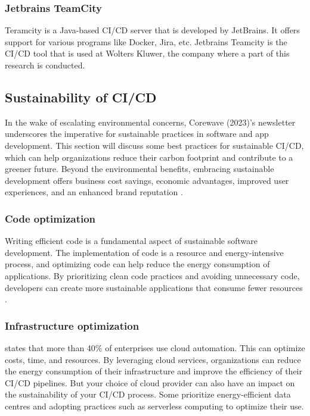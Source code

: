 \subsubsection{Jetbrains TeamCity}
Teramcity is a Java-based CI/CD server that is developed by JetBrains. It offers support for various programs like Docker, Jira, etc.
Jetbrains Teamcity is the CI/CD tool that is used at Wolters Kluwer, the company where a part of this research is conducted.

\subsection{Sustainability of CI/CD}
In the wake of escalating environmental concerns, Corewave (2023)’s newsletter underscores the imperative for sustainable practices in software and app development.
This section will discuss some best practices for sustainable CI/CD, which can help organizations reduce their carbon footprint and contribute to a greener future.
Beyond the environmental benefits, embracing sustainable development offers business cost savings, economic advantages, improved user experiences, and an enhanced brand reputation \autocite{linkedin}.

\subsubsection{Code optimization}
Writing efficient code is a fundamental aspect of sustainable software development. 
The implementation of code is a resource and energy-intensive process, and optimizing code can help reduce the energy consumption of applications.
By prioritizing clean code practices and avoiding unnecessary code, developers can create more sustainable applications that consume fewer resources \autocite{linkedin}.

\subsubsection{Infrastructure optimization} 
\textcite{colorlib} states that more than 40\% of enterprises use cloud automation. This can optimize costs, time, and resources.
By leveraging cloud services, organizations can reduce the energy consumption of their infrastructure and improve the efficiency of their CI/CD pipelines.
But your choice of cloud provider can also have an impact on the sustainability of your CI/CD process. 
Some prioritize energy-efficient data centres and adopting practices such as serverless computing to optimize their use.

